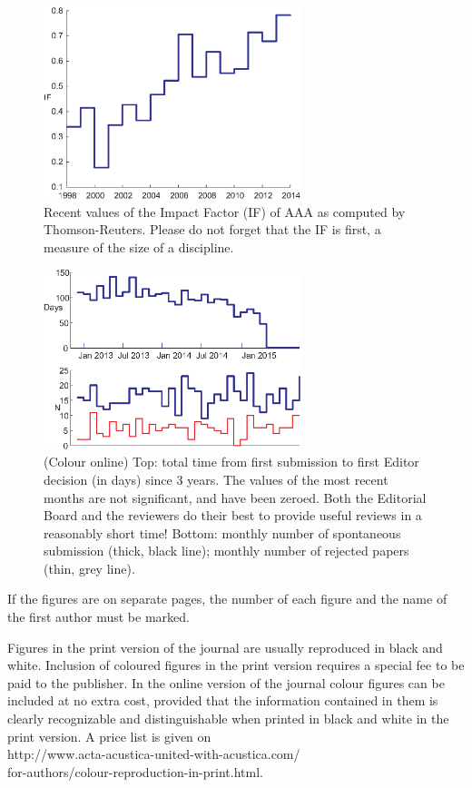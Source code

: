 \documentclass[twocolumn]{article}
\begin{document}
\begin{figure}
\centering
\includegraphics[width=75mm]{fig1}
\caption{Recent values of the Impact Factor (IF) of AAA as computed by
Thomson-Reuters. Please do not forget that the IF is first, a measure of
the size of a discipline.}
\label{fig1}
\end{figure}

\begin{figure}
\centering
\includegraphics[width=75mm]{fig2}
\caption{(Colour online) Top: total time from first submission to first
Editor decision (in days) since 3 years. The values of the most recent
months are not significant, and have been zeroed. Both the Editorial
Board and the reviewers do their best to provide useful reviews in a
reasonably short time! Bottom: monthly number of spontaneous submission
(thick, black line); monthly number of rejected papers (thin, grey
line). }
\label{fig2}
\end{figure}

If the figures are on separate pages, the number of each figure and the
name of the first author must be marked.

Figures in the print version of the journal are usually reproduced in
black and white. Inclusion of coloured figures in the print version
requires a special fee to be paid to the publisher. In the online
version of the journal colour figures can be included at no extra cost,
provided that the information contained in them is clearly recognizable
and distinguishable when printed in black and white in the print
version. A price list is given on \\
http://www.acta-acustica-united-with-acustica.com/\\
\hspace*{24pt}for-authors/colour-reproduction-in-print.html.
\end{document}
